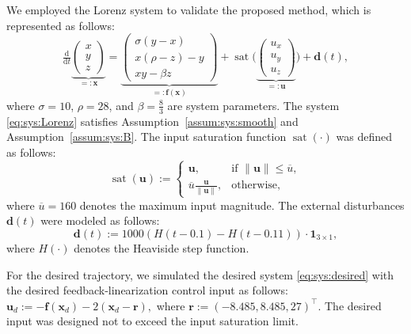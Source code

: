 \documentclass{ifacconf}
\newcommand*{\mv}[1]{\boldsymbol{#1}} %
\newcommand*{\norm}[1]{\lVert #1 \rVert} %
\DeclareMathOperator{\mysat}{{sat}}       %
\newcommand\der{\mathrm d}
\newcommand*{\ddtt}{
   \tfrac{\der}{\der t}
}
\begin{document}
We employed the Lorenz system to validate the proposed method, which is represented as follows:
\begin{equation} \label{eq:sys:Lorenz}
   \ddtt
   \underbrace{
      \begin{pmatrix}
         x\\y\\z
      \end{pmatrix}
   }_{=:\mv{x}}
   =
   \underbrace{
      \begin{pmatrix}
         \sigma(y-x)
         \\
         x(\rho-z)-y
         \\
         xy-\beta z
      \end{pmatrix}
   }_{=:\mv{f}(\mv{x})}
   +
   \mysat
   \bigg(
      \underbrace{
         \begin{pmatrix}
            u_x\\u_y\\u_z
         \end{pmatrix}
      }_{=:\mv{u}}
   \bigg)
   +
   \mv{d}(t)
   ,
\end{equation}
where $\sigma=10$, $\rho=28$, and $\beta=\tfrac{8}{3}$ are system parameters.
The system \eqref{eq:sys:Lorenz} satisfies Assumption~\ref{assum:sys:smooth} and Assumption~\ref{assum:sys:B}.
The input saturation function $\mysat(\cdot)$ was defined as follows:
\begin{equation}
   \mysat(\mv{u})
   :=
   \begin{cases}
      \mv{u}
      ,
      & \text{if } \norm{\mv{u}} \le \overline{u}
      ,
      \\
      \overline{u} \tfrac{\mv{u}}{\norm{\mv{u}}}
      ,
      & \text{otherwise}
      ,
   \end{cases}
\end{equation}
where $\overline{u}=160$ denotes the maximum input magnitude.
The external disturbances $\mv{d}(t)$ were modeled as follows:
\begin{equation}
   \mv{d}(t)
   :=
   1000 (H(t-0.1)-H(t-0.11))
   \cdot
   \mv{1}_{3\times1}
   ,
\end{equation}
where $H(\cdot)$ denotes the Heaviside step function.

For the desired trajectory, we simulated the desired system \eqref{eq:sys:desired} with the desired feedback-linearization control input as follows:
$
   \mv{u}_d
   :=
   -\mv{f}(\mv{x}_d) - 2(\mv{x}_d - \mv{r})
   ,
$
where $\mv{r}:=(-8.485,8.485,27)^\top$.
The desired input was designed not to exceed the input saturation limit.
\end{document}

